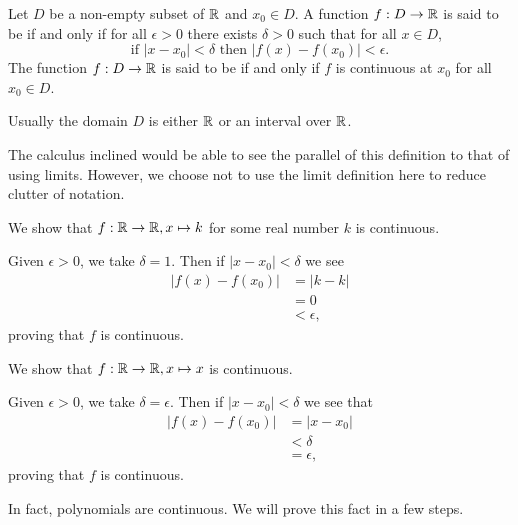 \begin{definition}
    Let $D$ be a non-empty subset of $\mathbb{R}$ and $x_0 \in D$. A function $f: D \to \mathbb{R}$ is said to be  if and only if for all $\epsilon > 0$ there exists $\delta > 0$ such that for all $x \in D$,
    \[
        \text{if } |x - x_0| < \delta \text{ then } |f(x) - f(x_0)| < \epsilon.
    \]
    The function $f: D \to \mathbb{R}$ is said to be  if and only if $f$ is continuous at $x_0$ for all $x_0 \in D$.
\end{definition}
\begin{remark}
    Usually the domain $D$ is either $\mathbb{R}$ or an interval over $\mathbb{R}$.
\end{remark}

The calculus inclined would be able to see the parallel of this definition to that of using limits. However, we choose not to use the limit definition here to reduce clutter of notation.

\begin{example}\label{example-constant-function-is-continuous}
    We show that $f: \mathbb{R} \to \mathbb{R}, x \mapsto k$ for some real number $k$ is continuous.

    Given $\epsilon > 0$, we take $\delta = 1$. Then if $|x - x_0| < \delta$ we see
    \begin{align*}
        |f(x) - f(x_0)| &= |k - k|\\
        &= 0\\
        &< \epsilon,
    \end{align*}
    proving that $f$ is continuous.
\end{example}

\begin{example}\label{example-identity-polynomial-is-continuous}
    We show that $f: \mathbb{R} \to \mathbb{R}, x \mapsto x$ is continuous.

    Given $\epsilon > 0$, we take $\delta = \epsilon$. Then if $|x - x_0| < \delta$ we see that
    \begin{align*}
        |f(x) - f(x_0)| &= |x - x_0|\\
        &< \delta\\
        &= \epsilon,
    \end{align*}
    proving that $f$ is continuous.
\end{example}

In fact, polynomials are continuous. We will prove this fact in a few steps.

